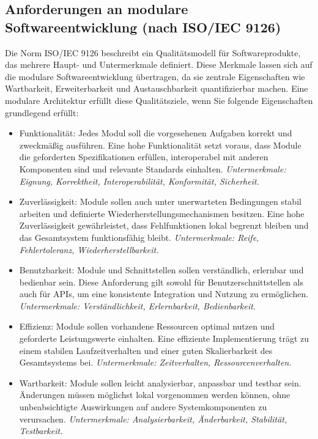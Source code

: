 \subsection{Anforderungen an modulare Softwareentwicklung (nach ISO/IEC 9126)}
\label{sec:anforderungen-an-modulare-softwareentwicklung-(nach-iso/iec-9126)}

Die Norm ISO/IEC 9126 beschreibt ein Qualitätsmodell für Softwareprodukte, das mehrere Haupt- und Untermerkmale definiert.
Diese Merkmale lassen sich auf die modulare Softwareentwicklung übertragen, da sie zentrale Eigenschaften wie Wartbarkeit, Erweiterbarkeit und Austauschbarkeit quantifizierbar machen.
Eine modulare Architektur erfüllt diese Qualitätsziele, wenn Sie folgende Eigenschaften grundlegend erfüllt:\cite{ISOIEC9126-1991}

\begin{itemize}
    \item Funktionalität:
    Jedes Modul soll die vorgesehenen Aufgaben korrekt und zweckmäßig ausführen.
    Eine hohe Funktionalität setzt voraus, dass Module die geforderten Spezifikationen erfüllen, interoperabel mit anderen Komponenten sind und relevante Standards einhalten.
    \emph{Untermerkmale: Eignung, Korrektheit, Interoperabilität, Konformität, Sicherheit.}

    \item Zuverlässigkeit:
    Module sollen auch unter unerwarteten Bedingungen stabil arbeiten und definierte Wiederherstellungsmechanismen besitzen.
    Eine hohe Zuverlässigkeit gewährleistet, dass Fehlfunktionen lokal begrenzt bleiben und das Gesamtsystem funktionsfähig bleibt.
    \emph{Untermerkmale: Reife, Fehlertoleranz, Wiederherstellbarkeit.}

    \item Benutzbarkeit:
    Module und Schnittstellen sollen verständlich, erlernbar und bedienbar sein.
    Diese Anforderung gilt sowohl für Benutzerschnittstellen als auch für APIs, um eine konsistente Integration und Nutzung zu ermöglichen.
    \emph{Untermerkmale: Verständlichkeit, Erlernbarkeit, Bedienbarkeit.}

    \item Effizienz:
    Module sollen vorhandene Ressourcen optimal nutzen und geforderte Leistungswerte einhalten.
    Eine effiziente Implementierung trägt zu einem stabilen Laufzeitverhalten und einer guten Skalierbarkeit des Gesamtsystems bei.
    \emph{Untermerkmale: Zeitverhalten, Ressourcenverhalten.}

    \item Wartbarkeit:
    Module sollen leicht analysierbar, anpassbar und testbar sein.
    Änderungen müssen möglichst lokal vorgenommen werden können, ohne unbeabsichtigte Auswirkungen auf andere Systemkomponenten zu verursachen.
    \emph{Untermerkmale: Analysierbarkeit, Änderbarkeit, Stabilität, Testbarkeit.}


\end{itemize}
